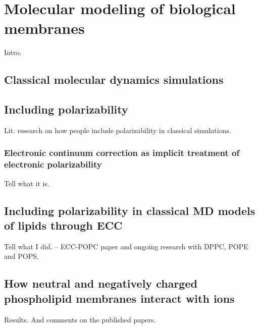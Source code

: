 \chapter{Molecular modeling of biological membranes}

  Intro.

\section{Classical molecular dynamics simulations}

\section{Including polarizability}

  Lit. research on how people include polarizability in classical simulations. 

\subsection{Electronic continuum correction as implicit treatment of electronic polarizability}

  Tell what it is.

\section{Including polarizability in classical MD models of lipids through ECC}

  Tell what I did.
  -- ECC-POPC paper and ongoing research with DPPC, POPE and POPS.

\section{How neutral and negatively charged phospholipid membranes interact with ions}

  Results.
  And comments on the published papers. 

